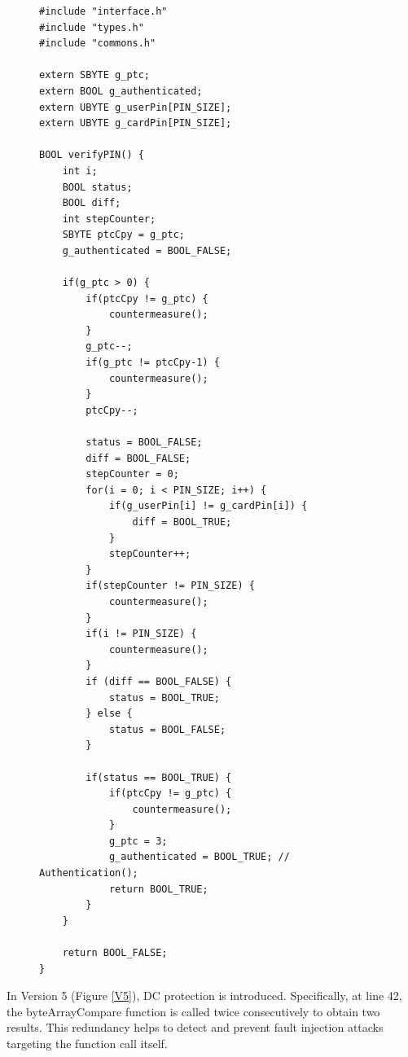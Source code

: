 \begin{figure}
\begin{lstlisting}[caption={code.c of VerifyPin function in benchmark V4}, label={V4}, basicstyle=\ttfamily\footnotesize]
#include "interface.h"
#include "types.h"
#include "commons.h"

extern SBYTE g_ptc;
extern BOOL g_authenticated;
extern UBYTE g_userPin[PIN_SIZE];
extern UBYTE g_cardPin[PIN_SIZE];

BOOL verifyPIN() {
    int i;
    BOOL status;
    BOOL diff;
    int stepCounter;
    SBYTE ptcCpy = g_ptc;
    g_authenticated = BOOL_FALSE;

    if(g_ptc > 0) {
        if(ptcCpy != g_ptc) {
            countermeasure();
        }
        g_ptc--;
        if(g_ptc != ptcCpy-1) {
            countermeasure();
        }
        ptcCpy--;

        status = BOOL_FALSE;
        diff = BOOL_FALSE;
        stepCounter = 0;
        for(i = 0; i < PIN_SIZE; i++) {
            if(g_userPin[i] != g_cardPin[i]) {
                diff = BOOL_TRUE;
            }
            stepCounter++;
        }
        if(stepCounter != PIN_SIZE) {
            countermeasure();
        }
        if(i != PIN_SIZE) {
            countermeasure();
        }
        if (diff == BOOL_FALSE) {
            status = BOOL_TRUE;
        } else {
            status = BOOL_FALSE;
        }

        if(status == BOOL_TRUE) {
            if(ptcCpy != g_ptc) {
                countermeasure();
            }
            g_ptc = 3;
            g_authenticated = BOOL_TRUE; // Authentication();
            return BOOL_TRUE;
        }
    }

    return BOOL_FALSE;
}
\end{lstlisting}
\end{figure}

In Version 5 (Figure \ref{V5}), DC protection is introduced. Specifically, at line 42, the byteArrayCompare function is called twice consecutively to obtain two results. This redundancy helps to detect and prevent fault injection attacks targeting the function call itself.

